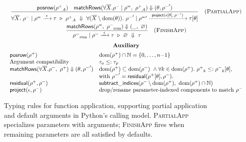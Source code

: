 \begin{figure*}[t]
\centering
\[
\begin{array}{c}
\displaystyle
\frac{
  \mathsf{posrow}(\rpos_A) \quad
  \mathsf{matchRows}(\forall\overline{X}.\rneg \mid \rdef,\ \rpos_A) \Downarrow (\theta, \rneg')
}{
  \forall\overline{X}.~\rneg \mid \rdef \xrightarrow{\ \epsilon\ } \tau
  \ \triangleright\ 
  \rpos_A
  \ \Downarrow\
  \forall(\overline{X}\setminus\mathrm{dom}(\theta)).~
  \rneg' \mid \rdef'
  \xrightarrow{\ \mathsf{project}(\epsilon[\theta],\,\rneg')\ }
  \tau[\theta]
}
\quad \textsc{(PartialApp)}
\\[1.5em]

\displaystyle
\frac{
  \mathsf{matchRows}(\rdef,\ \rneg_{\mathrm{rem}}) \Downarrow (\_,\ \varnothing)
}{
  \rneg_{\mathrm{rem}} \mid \rdef \xrightarrow{\ \epsilon\ } \tau \ \triangleright\ \varnothing \ \Downarrow\ \tau
}
\quad \textsc{(FinishApp)}
\\[1.5em]

\textbf{Auxiliary} \\[0.5em]
\begin{array}{ll}
\mathsf{posrow}(\rpos) & \mathrm{dom}(\rpos)\cap\mathbb{N}=\{0,\dots,n{-}1\} \\
\text{Argument compatibility} & \tau_a \leq: \tau_p \\
\mathsf{matchRows}(\forall\overline{X}.\rneg,\ \rpos)\Downarrow(\theta,\rneg') &
\begin{array}[t]{@{}l@{}}
\mathrm{dom}(\rpos) \subseteq \mathrm{dom}(\rneg)\ \wedge \forall k\in\mathrm{dom}(\rpos).\ \rpos_k \leq: \rneg_k[\theta],\ \\
\text{with }\rneg' = \mathsf{residual}(\rpos[\theta],\rneg).
\end{array}
\\
\mathsf{residual}(\rpos,\rneg) & \mathsf{subtract\_indices}(\rneg \setminus \mathrm{dom}(\rpos),\ \mathrm{dom}(\rpos)\cap\mathbb{N}) \\
\mathsf{project}(\epsilon,\rneg) & \text{drop/rename parameter-indexed components to match }\rneg \\
\end{array}
\end{array}
\]
\caption{Typing rules for function application, supporting partial application and default arguments in Python’s calling model. \textsc{PartialApp} specializes parameters with arguments; \textsc{FinishApp} fires when remaining parameters are all satisfied by defaults.}
\label{fig:app-rules}
\end{figure*}

